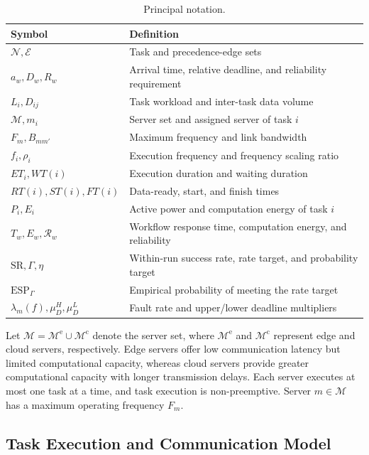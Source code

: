 \documentclass[lettersize,journal]{IEEEtran}
\begin{document}
\begin{table}[t]
\centering
\caption{Principal notation.}
\label{tab:notation}
\renewcommand{\arraystretch}{1.08}
\begin{tabular}{@{}p{}p{}@{}}
\toprule
Symbol & Definition \\
\midrule
$\mathcal{N},\mathcal{E}$ & Task and precedence-edge sets \\
$a_w,D_w,R_w$ & Arrival time, relative deadline, and reliability requirement \\
$L_i,D_{ij}$ & Task workload and inter-task data volume \\
$\mathcal{M},m_i$ & Server set and assigned server of task $i$ \\
$F_m,B_{mm'}$ & Maximum frequency and link bandwidth \\
$f_i,\rho_i$ & Execution frequency and frequency scaling ratio \\
$ET_i,WT(i)$ & Execution duration and waiting duration \\
$RT(i),ST(i),FT(i)$ & Data-ready, start, and finish times \\
$P_i,E_i$ & Active power and computation energy of task $i$ \\
$T_w,E_w,\mathcal{R}_w$ & Workflow response time, computation energy, and reliability \\
$\mathrm{SR},\Gamma,\eta$ & Within-run success rate, rate target, and probability target \\
$\mathrm{ESP}_{\Gamma}$ & Empirical probability of meeting the rate target \\
$\lambda_m(f),\mu_D^H,\mu_D^L$ & Fault rate and upper/lower deadline multipliers \\
\bottomrule
\end{tabular}
\end{table}

Let $\mathcal{M}=\mathcal{M}^{\mathrm{e}}\cup
\mathcal{M}^{\mathrm{c}}$ denote the server set, where
$\mathcal{M}^{\mathrm{e}}$ and $\mathcal{M}^{\mathrm{c}}$
represent edge and cloud servers, respectively.
Edge servers offer low communication latency but limited
computational capacity, whereas cloud servers provide
greater computational capacity with longer transmission
delays. Each server executes at most one task at a time,
and task execution is non-preemptive.
Server $m\in\mathcal{M}$ has a maximum operating frequency
$F_m$.


\subsection{Task Execution and Communication Model}
\end{document}
